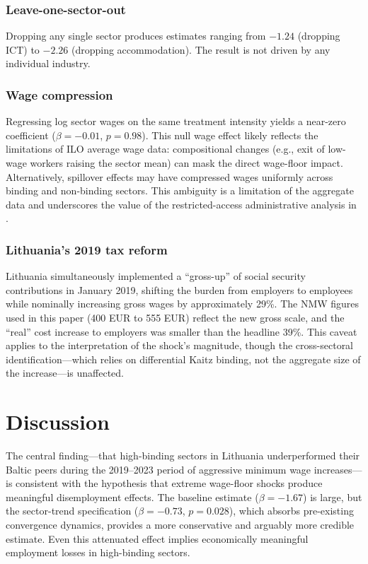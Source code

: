 \documentclass[12pt]{article}
\begin{document}
\subsubsection*{Leave-one-sector-out} Dropping any single sector produces estimates ranging from $-1.24$ (dropping ICT) to $-2.26$ (dropping accommodation). The result is not driven by any individual industry.

\subsubsection*{Wage compression} Regressing log sector wages on the same treatment intensity yields a near-zero coefficient ($\beta = -0.01$, $p = 0.98$). This null wage effect likely reflects the limitations of ILO average wage data: compositional changes (e.g., exit of low-wage workers raising the sector mean) can mask the direct wage-floor impact. Alternatively, spillover effects may have compressed wages uniformly across binding and non-binding sectors. This ambiguity is a limitation of the aggregate data and underscores the value of the restricted-access administrative analysis in \citet{zilio2023lithuania}.

\subsubsection*{Lithuania's 2019 tax reform} Lithuania simultaneously implemented a ``gross-up'' of social security contributions in January 2019, shifting the burden from employers to employees while nominally increasing gross wages by approximately 29\%. The NMW figures used in this paper (400 EUR to 555 EUR) reflect the new gross scale, and the ``real'' cost increase to employers was smaller than the headline 39\%. This caveat applies to the interpretation of the shock's magnitude, though the cross-sectoral identification---which relies on differential Kaitz binding, not the aggregate size of the increase---is unaffected.

\section{Discussion}

The central finding---that high-binding sectors in Lithuania underperformed their Baltic peers during the 2019--2023 period of aggressive minimum wage increases---is consistent with the hypothesis that extreme wage-floor shocks produce meaningful disemployment effects. The baseline estimate ($\beta = -1.67$) is large, but the sector-trend specification ($\beta = -0.73$, $p = 0.028$), which absorbs pre-existing convergence dynamics, provides a more conservative and arguably more credible estimate. Even this attenuated effect implies economically meaningful employment losses in high-binding sectors.
\end{document}
